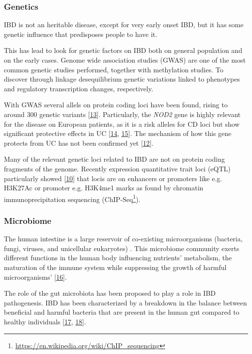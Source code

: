 \documentclass[
  12pt,
  a4paper,
  twoside,
  openright]{book}
\DeclareRobustCommand{\href}[2]{#2\footnote{\url{#1}}}
\begin{document}
\hypertarget{genetics}{%
\subsubsection{Genetics}\label{genetics}}

IBD is not an heritable disease, except for very early onset IBD, but it has some genetic influence that predisposes people to have it.

This has lead to look for genetic factors on IBD both on general population and on the early cases.
Genome wide association studies (GWAS) are one of the most common genetic studies performed, together with methylation studies.
To discover through linkage desequilibrium genetic variations linked to phenotypes and regulatory transcription changes, respectively.

With GWAS several allels on protein coding loci have been found, rising to around 300 genetic variants {[}\protect\hyperlink{ref-kumar2019}{13}{]}.
Particularly, the \emph{NOD2} gene is highly relevant for the disease on European patients, as it is a risk alleles for CD loci but show significant protective effects in UC {[}\protect\hyperlink{ref-jostins2012}{14}, \protect\hyperlink{ref-momozawa2018}{15}{]}.
The mechanism of how this gene protects from UC has not been confirmed yet {[}\protect\hyperlink{ref-horowitz2021}{12}{]}.

Many of the relevant genetic loci related to IBD are not on protein coding fragments of the genome.
Recently expression quantitative trait loci (eQTL) particularly showed {[}\protect\hyperlink{ref-mcgovern2015}{10}{]} that locis are on enhancers or promoters like e.g.
H3K27Ac or promoter e.g.
H3K4me1 marks as found by chromatin immunoprecipitation sequencing (\href{https://en.wikipedia.org/wiki/ChIP_sequencing}{ChIP-Seq}).

\hypertarget{microbiome}{%
\subsubsection{Microbiome}\label{microbiome}}

The human intestine is a large reservoir of co-existing microorganisms (bacteria, fungi, viruses, and unicellular eukaryotes) .
This microbiome community exerts different functions in the human body influencing nutrients' metabolism, the maturation of the immune system while suppressing the growth of harmful microorganisms' {[}\protect\hyperlink{ref-khanna2014}{16}{]}.

The role of the gut microbiota has been proposed to play a role in IBD pathogenesis.
IBD has been characterized by a breakdown in the balance between beneficial and harmful bacteria that are present in the human gut compared to healthy individuals {[}\protect\hyperlink{ref-swidsinski2002}{17}, \protect\hyperlink{ref-tamboli2004}{18}{]}.
\end{document}
